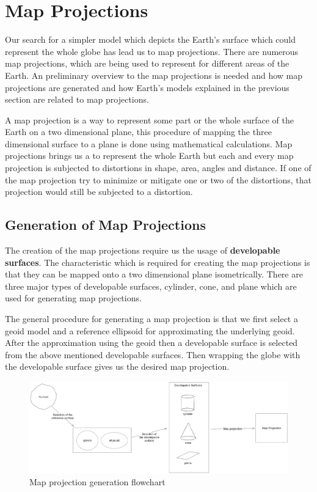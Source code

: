 

\section{Map Projections}
\label{section:map_projections}
Our search for a simpler model which depicts the Earth's surface which could represent the whole globe has lead us to map projections.
There are numerous map projections, which are being used to represent for different areas of the Earth. An preliminary overview to the map projections is needed and how map projections are generated and how Earth's models explained in the previous section are related to map projections.

A map projection is a way to represent some part or the whole surface of the Earth on a two dimensional plane, this procedure of mapping the three dimensional surface to a plane is done using mathematical calculations.
Map projections brings us a to represent the whole Earth but each and every map projection is subjected to distortions in shape, area, angles and distance. If one of the map projection try to minimize or mitigate one or two of the distortions, that projection would still be subjected to a distortion.

\subsection{Generation of Map Projections}
The creation of the map projections require us the usage of \textbf{developable surfaces}. The characteristic which is required for creating the map projections is that they can be mapped onto a two dimensional plane isometrically\cite{Patrikalakis_Maekawa_2010}.
There are three major types of developable surfaces, cylinder, cone, and plane which are used for generating map projections.

The general procedure for generating a map projection is that we first select a geoid model and a reference ellipsoid for approximating the underlying geoid. After the approximation using the geoid then a developable surface is selected from the above mentioned developable surfaces.
Then wrapping the globe with the developable surface gives us the desired map projection.

\begin{figure}[H]
    \centering
    \includegraphics[width=1.0\textwidth]{figures/chapter-3/map_projection_creation.png}
    \caption{Map projection generation flowchart  }
    \label{fig:earth-image}
\end{figure}

